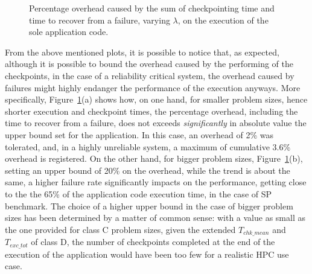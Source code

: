 {\captionsetup[subfloat]{labelformat=empty}
\begin{figure}
    \centering
    {
    \vspace{-1.1em}}
    {
    \vspace{-1.1em}}
    {
    }
    \caption{Percentage overhead caused by the sum of checkpointing time and time to recover from a failure, varying $\lambda$, on the execution of the sole application code.}%
    \label{fig:real_perc}%
\end{figure}}

From the above mentioned plots, it is possible to notice that, as expected, although it is possible to bound the overhead caused by the performing of the checkpoints, in the case of a reliability critical system, the overhead caused by failures might highly endanger the performance of the execution anyways. More specifically, Figure~\ref{fig:real_perc}(a) shows how, on one hand, for smaller problem sizes, hence shorter execution and checkpoint times, the percentage overhead, including the time to recover from a failure, does not exceeds \emph{significantly} in absolute value the upper bound set for the application. In this case, an overhead of 2\% was tolerated, and, in a highly unreliable system, a maximum of cumulative 3.6\% overhead is registered. On the other hand, for bigger problem sizes, Figure~\ref{fig:real_perc}(b), setting an upper bound of 20\% on the overhead, while the trend is about the same, a higher failure rate significantly impacts on the performance, getting close to the the 65\% of the application code execution time, in the case of SP benchmark. The choice of a higher upper bound in the case of bigger problem sizes has been determined by a matter of common sense: with a value as small as the one provided for class C problem sizes, given the extended $T_{chk\_mean}$ and $T_{exc\_tot}$ of class D, the number of checkpoints completed at the end of the execution of the application would have been too few for a realistic HPC use case.

